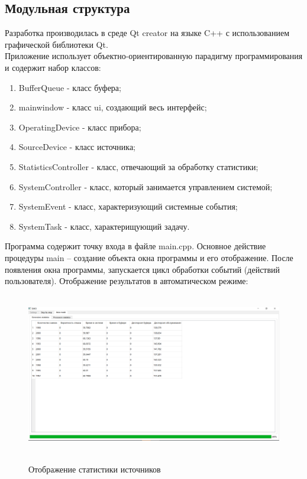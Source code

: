 \documentclass{article}
\begin{document}
	\subsection{Модульная структура}
	Разработка производилась в среде Qt creator на языке C++ с использованием графической библиотеки Qt.\\
	Приложение использует объектно-ориентированную парадигму программирования и содержит набор классов:\\
	\begin{enumerate}
	\item BufferQueue - класс буфера;
	\item mainwindow - класс ui, создающий весь интерфейс;
	\item OperatingDevice - класс прибора;
	\item SourceDevice - класс источника;
	\item StatisticsController - класс, отвечающий за обработку статистики;
	\item SystemController - класс, который занимается управлением системой;
	\item SystemEvent - класс, характеризующий системные события;
	\item SystemTask - класс, характерищующий задачу.
	\end{enumerate}
	Программа содержит точку входа в файле main.cpp. Основное действие процедуры main – создание объекта окна программы и его отображение. После появления окна программы, запускается цикл обработки событий (действий пользователя).
	Отображение результатов в автоматическом режиме:\\
	\begin{figure}[!htbp]
		\centering
		\includegraphics[width=\textwidth,height=200pt,keepaspectratio]{auto_1.png}\\
		\caption{Отображение статистики источников}
	\end{figure}
\end{document}
